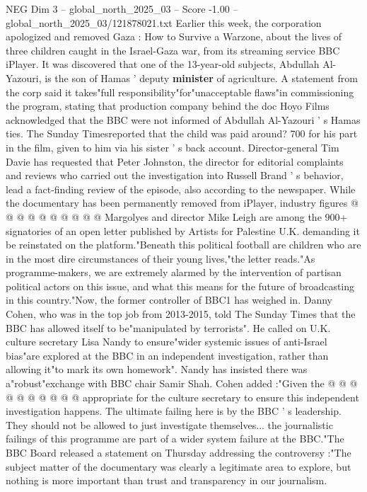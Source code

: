 \begin{textsample}{NEG Dim 3 – global\_north\_2025\_03 – Score -1.00 – global\_north\_2025\_03/121878021.txt}  \label{ex:f3_neg_435}
Earlier this week, the corporation apologized and removed Gaza : How to Survive a Warzone, about the lives of three children caught in the Israel-Gaza war, from its streaming service BBC iPlayer.
It was discovered that one of the 13-year-old subjects, Abdullah Al-Yazouri, is the son of Hamas ' deputy \textbf{minister} of agriculture.
A statement from the corp said it takes"full responsibility"for"unacceptable flaws"in commissioning the program, stating that production company behind the doc Hoyo Films acknowledged that the BBC were not informed of Abdullah Al-Yazouri ' s Hamas ties.
The Sunday Timesreported that the child was paid around? 700 for his part in the film, given to him via his sister ' s back account.
Director-general Tim Davie has requested that Peter Johnston, the director for editorial complaints and reviews who carried out the investigation into Russell Brand ' s behavior, lead a fact-finding review of the episode, also according to the newspaper.
While the documentary has been permanently removed from iPlayer, industry figures @ @ @ @ @ @ @ @ @ @ Margolyes and director Mike Leigh are among the 900+ signatories of an open letter published by Artists for Palestine U.K. demanding it be reinstated on the platform."Beneath this political football are children who are in the most dire circumstances of their young lives,"the letter reads."As programme-makers, we are extremely alarmed by the intervention of partisan political actors on this issue, and what this means for the future of broadcasting in this country."Now, the former controller of BBC1 has weighed in.
Danny Cohen, who was in the top job from 2013-2015, told The Sunday Times that the BBC has allowed itself to be"manipulated by terrorists".
He called on U.K. culture secretary Lisa Nandy to ensure"wider systemic issues of anti-Israel bias"are explored at the BBC in an independent investigation, rather than allowing it"to mark its own homework".
Nandy has insisted there was a"robust"exchange with BBC chair Samir Shah.
Cohen added :"Given the @ @ @ @ @ @ @ @ @ @ appropriate for the culture secretary to ensure this independent investigation happens.
The ultimate failing here is by the BBC ' s leadership.
They should not be allowed to just investigate themselves... the journalistic failings of this programme are part of a wider system failure at the BBC."The BBC Board released a statement on Thursday addressing the controversy :"The subject matter of the documentary was clearly a legitimate area to explore, but nothing is more important than trust and transparency in our journalism.

\end{textsample}
